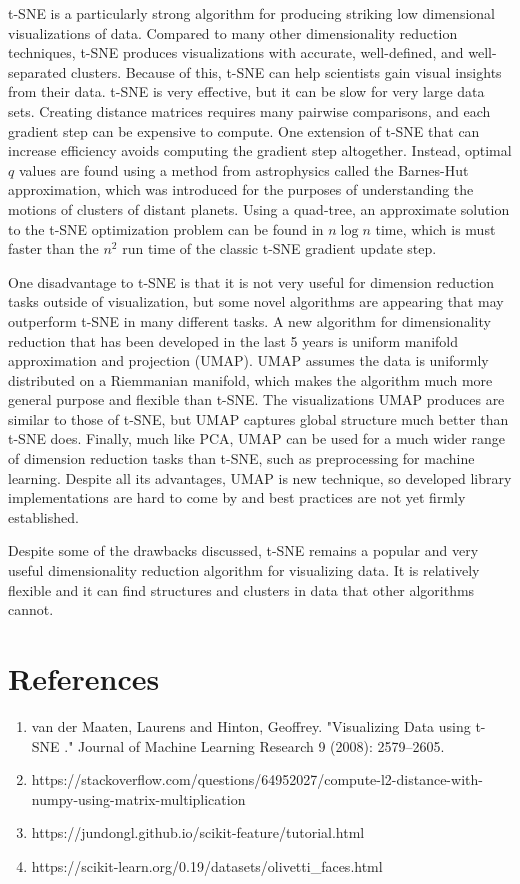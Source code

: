 \documentclass{article}
\begin{document}
t-SNE is a particularly strong algorithm for producing striking low dimensional visualizations of data. Compared to many other dimensionality reduction techniques, t-SNE produces visualizations with accurate, well-defined, and well-separated clusters. Because of this, t-SNE can help scientists gain visual insights from their data. t-SNE is very effective, but it can be slow for very large data sets. Creating distance matrices requires many pairwise comparisons, and each gradient step can be expensive to compute. One extension of t-SNE that can increase efficiency avoids computing the gradient step altogether. Instead, optimal $q$ values are found using a method from astrophysics called the Barnes-Hut approximation, which was introduced for the purposes of understanding the motions of clusters of distant planets. Using a quad-tree, an approximate solution to the t-SNE optimization problem can be found in $n \log n$ time, which is must faster than the $n^2$ run time of the classic t-SNE gradient update step. 

One disadvantage to t-SNE is that it is not very useful for dimension reduction tasks outside of visualization, but some novel algorithms are appearing that may outperform t-SNE in many different tasks. A new algorithm for dimensionality reduction that has been developed in the last 5 years is uniform manifold approximation and projection (UMAP). UMAP assumes the data is uniformly distributed on a Riemmanian manifold, which makes the algorithm much more general purpose and flexible than t-SNE. The visualizations UMAP produces are similar to those of t-SNE, but UMAP captures global structure much better than t-SNE does. Finally, much like PCA, UMAP can be used for a much wider range of dimension reduction tasks than t-SNE, such as preprocessing for machine learning. Despite all its advantages, UMAP is new technique, so developed library implementations are hard to come by and best practices are not yet firmly established. 

Despite some of the drawbacks discussed, t-SNE remains a popular and very useful dimensionality reduction algorithm for visualizing data. It is relatively flexible and it can find structures and clusters in data that other algorithms cannot. 
 
\section*{References}

\begin{enumerate}
  \item van der Maaten, Laurens and Hinton, Geoffrey. "Visualizing Data using t-SNE ." Journal of Machine Learning Research 9 (2008): 2579--2605.
  \item https://stackoverflow.com/questions/64952027/compute-l2-distance-with-numpy-using-matrix-multiplication
  \item https://jundongl.github.io/scikit-feature/tutorial.html
  \item https://scikit-learn.org/0.19/datasets/olivetti\_faces.html
\end{enumerate}
\end{document}
